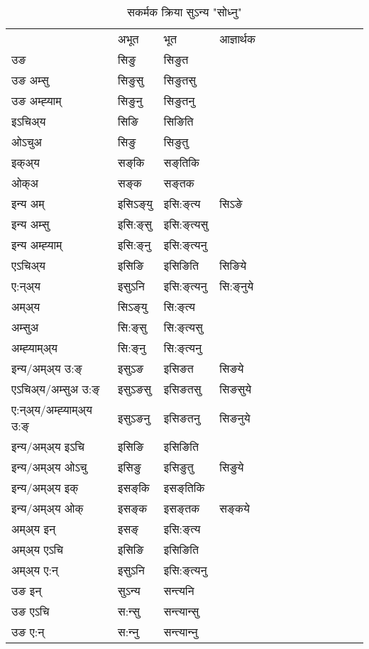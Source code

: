 \begin{table}[H]
\centering
\caption{\label{iŋ.vt} सकर्मक क्रिया  सुऽन्य  "सोध्नु"  }
\begin{tabular}{l|l|l|l|l|l|l|l|l|l|l|l|l}  \toprule
&अभूत & भूत & आज्ञार्थक \\ 
उङ &सिङु &सिङुत \\ 
उङ अम्सु &सिङुसु &सिङुतसु \\ 
उङ अम्ह्‍याम् &सिङुनु &सिङुतनु \\ 
इऽचिअ्य &सिङि &सिङिति   \\ 
ओऽचुअ &सिङु &सिङुतु   \\ 
इक्अ्य &सङ्‌कि &सङ्‌तिकि   \\ 
ओक्अ &सङ्‌क &सङ्‌तक   \\ 
इन्य अम् & इसिऽङ्‌यु  & इसि:ङ्‌त्य &सिऽङे  \\ 
इन्य अम्सु & इसि:ङ्‌सु  & इसि:ङ्‌त्यसु   \\ 
इन्य अम्ह्‍याम् & इसि:ङ्‌नु  & इसि:ङ्‌त्यनु   \\ 
एऽचिअ्य & इसिङि & इसिङिति &सिङिये    \\ 
ए:न्अ्य & इसुऽनि  & इसि:ङ्‌त्यनु &सि:ङ्‌नुये  \\ 
अम्अ्य & सिऽङ्‌यु  & सि:ङ्‌त्य  \\ 
अम्सुअ & सि:ङ्‌सु & सि:ङ्‌त्यसु  \\ 
अम्ह्‍याम्अ्य & सि:ङ्‌नु  & सि:ङ्‌त्यनु \\ 
\midrule
इन्य/अम्अ्य उ:ङ्‌&इसुऽङ & इसिङत &सिङये \\ 
एऽचिअ्य/अम्सुअ उ:ङ्‌ &इसुऽङसु & इसिङतसु &सिङसुये \\ 
ए:न्अ्य/अम्ह्‍याम्अ्य उ:ङ्‌ &इसुऽङनु & इसिङतनु &सिङनुये \\ 
इन्य/अम्अ्य इऽचि & इसिङि & इसिङिति    \\ 
इन्य/अम्अ्य ओऽचु & इसिङु & इसिङुतु  &सिङुये  \\ 
इन्य/अम्अ्य इक् & इसङ्‌कि & इसङ्‌तिकि   \\ 
इन्य/अम्अ्य ओक् & इसङ्‌क & इसङ्‌तक  &सङ्‌कये  \\ 
अम्अ्य इन् & इसङ्‌ & इसि:ङ्‌त्य   \\ 
अम्अ्य एऽचि & इसिङि & इसिङिति    \\ 
अम्अ्य ए:न् & इसुऽनि  & इसि:ङ्‌त्यनु  \\ 
\midrule
उङ इन् & सुऽन्य  & सन्त्यनि  \\ 
उङ एऽचि & स:न्सु  & सन्त्यान्सु   \\ 
उङ ए:न्& स:न्‍नु  & सन्त्यान्‍नु   \\ 
\bottomrule
\end{tabular}
\end{table}


